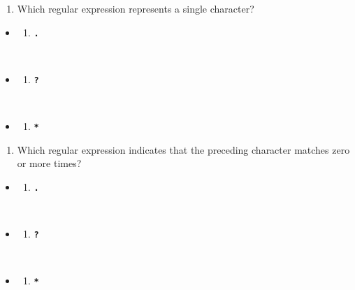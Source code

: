 \documentclass[
  letterpaper,
  DIV=11,
  numbers=noendperiod]{scrreprt}
\providecommand{\tightlist}{%
  \setlength{\itemsep}{0pt}\setlength{\parskip}{0pt}}
\begin{document}
\begin{enumerate}
\def\labelenumi{\arabic{enumi}.}
\setcounter{enumi}{7}
\tightlist
\item
  Which regular expression represents a single character?
\end{enumerate}

\begin{itemize}
\tightlist
\item
  \begin{enumerate}
  \def\labelenumi{(\Alph{enumi})}
  \tightlist
  \item
    \textbf{\texttt{.}}\strut \\
  \end{enumerate}
\item
  \begin{enumerate}
  \def\labelenumi{(\Alph{enumi})}
  \setcounter{enumi}{1}
  \tightlist
  \item
    \textbf{\texttt{?}}\strut \\
  \end{enumerate}
\item
  \begin{enumerate}
  \def\labelenumi{(\Alph{enumi})}
  \setcounter{enumi}{2}
  \tightlist
  \item
    \textbf{\texttt{*}}
  \end{enumerate}
\end{itemize}

\begin{enumerate}
\def\labelenumi{\arabic{enumi}.}
\setcounter{enumi}{8}
\tightlist
\item
  Which regular expression indicates that the preceding character
  matches zero or more times?
\end{enumerate}

\begin{itemize}
\tightlist
\item
  \begin{enumerate}
  \def\labelenumi{(\Alph{enumi})}
  \tightlist
  \item
    \textbf{\texttt{.}}\strut \\
  \end{enumerate}
\item
  \begin{enumerate}
  \def\labelenumi{(\Alph{enumi})}
  \setcounter{enumi}{1}
  \tightlist
  \item
    \textbf{\texttt{?}}\strut \\
  \end{enumerate}
\item
  \begin{enumerate}
  \def\labelenumi{(\Alph{enumi})}
  \setcounter{enumi}{2}
  \tightlist
  \item
    \textbf{\texttt{*}}
  \end{enumerate}
\end{itemize}
\end{document}
